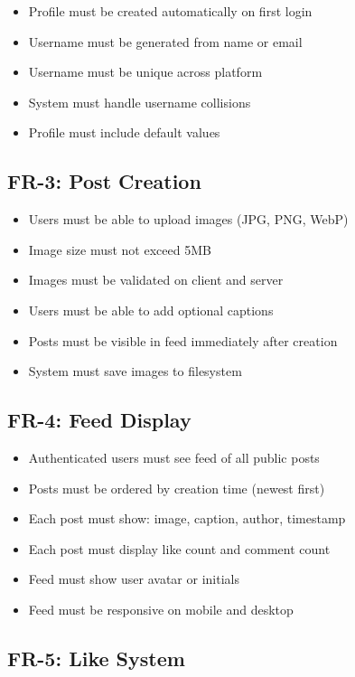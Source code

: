 \documentclass[12pt,a4paper]{report}
\begin{document}
\begin{itemize}
    \item Profile must be created automatically on first login
    \item Username must be generated from name or email
    \item Username must be unique across platform
    \item System must handle username collisions
    \item Profile must include default values
\end{itemize}

\subsection{FR-3: Post Creation}

\begin{itemize}
    \item Users must be able to upload images (JPG, PNG, WebP)
    \item Image size must not exceed 5MB
    \item Images must be validated on client and server
    \item Users must be able to add optional captions
    \item Posts must be visible in feed immediately after creation
    \item System must save images to filesystem
\end{itemize}

\subsection{FR-4: Feed Display}

\begin{itemize}
    \item Authenticated users must see feed of all public posts
    \item Posts must be ordered by creation time (newest first)
    \item Each post must show: image, caption, author, timestamp
    \item Each post must display like count and comment count
    \item Feed must show user avatar or initials
    \item Feed must be responsive on mobile and desktop
\end{itemize}

\subsection{FR-5: Like System}
\end{document}
